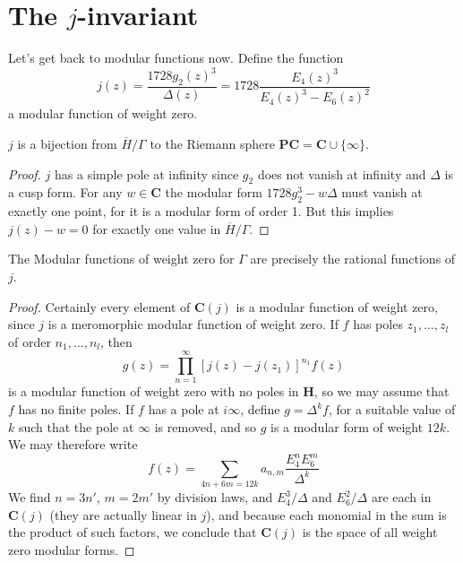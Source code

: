 \section{The $j$-invariant}

Let's get back to modular functions now. Define the function
%
\[ j(z) = \frac{1728 g_2(z)^3}{\Delta(z)} = 1728 \frac{E_4(z)^3}{E_4(z)^3 - E_6(z)^2} \]
%
a modular function of weight zero.

\begin{theorem}
    $j$ is a bijection from $\overline{H}/\Gamma$ to the Riemann sphere $\mathbf{P} \mathbf{C} = \mathbf{C} \cup \{ \infty \}$.
\end{theorem}
\begin{proof}
    $j$ has a simple pole at infinity since $g_2$ does not vanish at infinity and $\Delta$ is a cusp form. For any $w \in \mathbf{C}$ the modular form $1728 g_2^3 - w \Delta$ must vanish at exactly one point, for it is a modular form of order 1. But this implies $j(z) - w = 0$ for exactly one value in $\overline{H}/\Gamma$.
\end{proof}

\begin{theorem}
    The Modular functions of weight zero for $\Gamma$ are precisely the rational functions of $j$.
\end{theorem}
\begin{proof}
    Certainly every element of $\mathbf{C}(j)$ is a modular function of weight zero, since $j$ is a meromorphic modular function of weight zero. If $f$ has poles $z_1, \dots, z_l$ of order $n_1, \dots, n_l$, then
    \[ g(z) = \prod_{n = 1}^\infty [j(z) - j(z_1)]^{n_1} f(z) \]
    is a modular function of weight zero with no poles in $\mathbf{H}$, so we may assume that $f$ has no finite poles. If $f$ has a pole at $i \infty$, define $g = \Delta^k f$, for a suitable value of $k$ such that the pole at $\infty$ is removed, and so $g$ is a modular form of weight $12k$. We may therefore write
    \[ f(z) = \sum_{4n + 6m = 12k} a_{n,m} \frac{E_4^n E_6^m}{\Delta^k} \]
    We find $n = 3n'$, $m = 2m'$ by division laws, and $E_4^3/\Delta$ and $E_6^2/\Delta$ are each in $\mathbf{C}(j)$ (they are actually linear in $j$), and because each monomial in the sum is the product of such factors, we conclude that $\mathbf{C}(j)$ is the space of all weight zero modular forms.
\end{proof}

